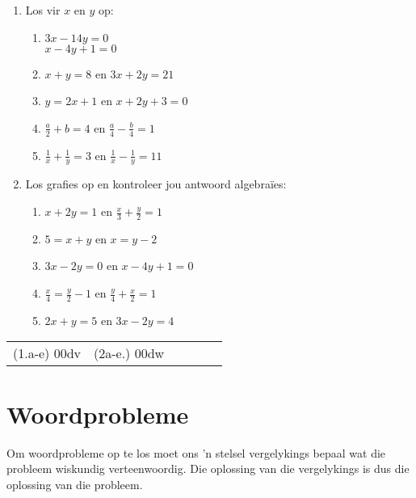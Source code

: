 \begin{exercises}{}
{
\begin{enumerate}[noitemsep, label=\textbf{\arabic*}. ] 
\item Los vir $x$ en $y$ op: 
\begin{enumerate}[noitemsep, label=\textbf{(\alph*)} ] 
\item $3x-14y=0$\\$x-4y+1=0$
\item $x+y=8$ en $3x + 2y = 21$
\item $y=2x+1$ en $x + 2y + 3 = 0$
\item $\frac{a}{2}+b=4$ en $\frac{a}{4} -\frac{b}{4}=1$
\item $\frac{1}{x}+\frac{1}{y}=3$ en $\frac{1}{x}-\frac{1}{y}=11$
\end{enumerate}

\item Los grafies op en kontroleer jou antwoord algebraïes:

\begin{enumerate}[noitemsep, label=\textbf{(\alph*)} ] 

\item  $x+2y=1$ en $\frac{x}{3} + \frac{y}{2} = 1$
\item $5= x+y$ en $x = y-2$
\item $3x - 2y = 0$ en $x - 4y + 1 = 0$
\item $\frac{x}{4}=\frac{y}{2}-1$  en $\frac{y}{4}+\frac{x}{2}=1$
\item $2x+y=5$ en $3x-2y=4$
\end{enumerate}
\end{enumerate}
\practiceinfo
\par 
\par \begin{tabular}[h]{cccccc}
(1.a-e) 00dv&  (2a-e.) 00dw & \end{tabular}
}
\end{exercises}

\section{Woordprobleme}

Om woordprobleme op te los moet ons 'n stelsel vergelykings bepaal wat die probleem wiskundig verteenwoordig. Die oplossing van die vergelykings is dus die oplossing van die probleem.


